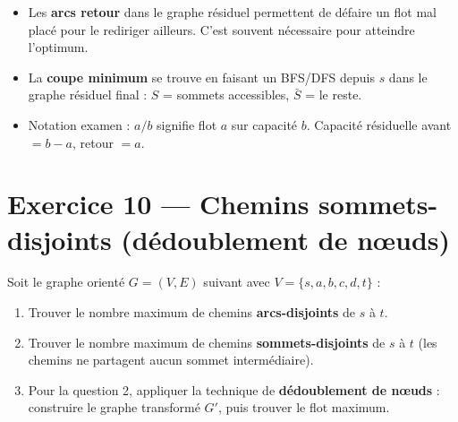 \documentclass[12pt,a4paper]{article}
\begin{document}
\begin{attention}
\begin{itemize}
    \item Les \textbf{arcs retour} dans le graphe r\'esiduel permettent de \og d\'efaire \fg{} un flot mal plac\'e pour le rediriger ailleurs. C'est souvent n\'ecessaire pour atteindre l'optimum.
    \item La \textbf{coupe minimum} se trouve en faisant un BFS/DFS depuis $s$ dans le graphe r\'esiduel final : $S$ = sommets accessibles, $\bar{S}$ = le reste.
    \item Notation examen : $a/b$ signifie flot $a$ sur capacit\'e $b$. Capacit\'e r\'esiduelle avant $= b-a$, retour $= a$.
\end{itemize}
\end{attention}


\newpage
\section{Exercice 10 --- Chemins sommets-disjoints (d\'edoublement de n\oe uds)}

\begin{enonce}
Soit le graphe orient\'e $G = (V, E)$ suivant avec $V = \{s, a, b, c, d, t\}$ :

\begin{center}
\end{center}

\begin{enumerate}
    \item Trouver le nombre maximum de chemins \textbf{arcs-disjoints} de $s$ \`a $t$.
    \item Trouver le nombre maximum de chemins \textbf{sommets-disjoints} de $s$ \`a $t$ (les chemins ne partagent aucun sommet interm\'ediaire).
    \item Pour la question 2, appliquer la technique de \textbf{d\'edoublement de n\oe uds} : construire le graphe transform\'e $G'$, puis trouver le flot maximum.
\end{enumerate}
\end{enonce}
\end{document}

